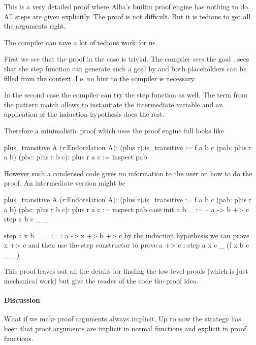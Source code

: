 This is a very detailed proof where Alba's builtin proof engine has nothing to
do. All steps are given explicitly. The proof is not difficult. But it is
tedious to get all the arguments right.

The compiler can save  a lot of tedious work for us.

First we see that the proof in the  case is trivial. The compiler
sees the goal , sees that the step function can generate such
a goal by  and both placeholders
can be filled from the context. I.e. no hint to the compiler is necessary.

In the second case the compiler can try the step function as well. The term
 from the pattern match allows to instantiate the intermediate
variable  and an application of the induction hypothesis does the
rest.

Therefore a minimalistic proof which uses the proof engine full looks like
%
\begin{alba}
  plus_transitive A (r:Endorelation A): (plus r).is_transitive :=
    f a b c (pab: plus r a b) (pbc: plus r b c): plus r a c :=
      inspect
        pab
\end{alba}
%
However such a condensed code gives no information to the user on how to do
the proof. An intermediate version might be
%
\begin{alba}
  plus_transitive A (r:Endorelation A): (plus r).is_transitive :=
    f a b c (pab: plus r a b) (pbc: plus r b c): plus r a c :=
      inspect
        pab
      case
        init a b _ :=
            -- a -> b +> c
          step a b c _ _

        step a x b _ _ :=
            {: a -> x +> b +> c
               by the induction hypothesis we can prove x +> c
               and then use the step constructor to prove a +> c :}
          step a x c _ (f x b c _ _)
\end{alba}
%
This proof leaves out all the details for finding the low level proofs (which
is just mechanical work) but give the reader of the code the proof idea.



\paragraph{Discussion} What if we make proof arguments always implicit. Up to
now the strategy has been that proof arguments are implicit in normal
functions and explicit in proof functions.


